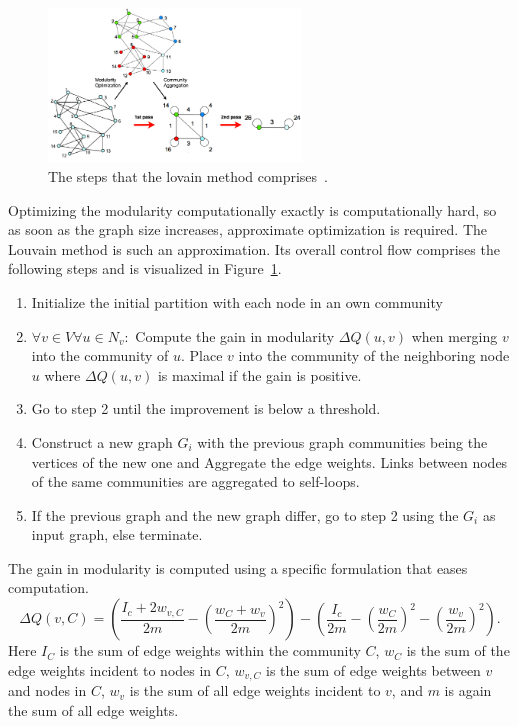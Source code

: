                 \begin{figure}[htp]
                    \begin{center}
                        \includegraphics[keepaspectratio,width=0.6\textwidth]{img/03-graphs/louvain.png}
                    \end{center}
                    \caption{The steps that the lovain method comprises~\autocite{blondel2008fast}.} 
                    \label{louvain-fig}
                \end{figure}
                
                Optimizing the modularity computationally exactly is computationally hard, so as soon as the graph size increases, approximate optimization is required.
                The Louvain method is such an approximation.
                Its overall control flow comprises the following steps and is visualized in Figure~\ref{louvain-fig}.
                \begin{enumerate}
                \item Initialize the initial partition with each node in an own community
                \item $\forall v \in V \forall u \in N_v:$ 
                Compute the gain in modularity $\Delta Q(u,v)$ when merging $v$ into the community of $u$. 
                Place $v$ into the community of the neighboring node $u$ where $\Delta Q(u,v)$ is maximal if the gain is positive.
                \item Go to step 2 until the improvement is below a threshold.
                \item Construct a new graph $G_i$ with the previous graph communities being the vertices of the new one and Aggregate the edge weights. 
                Links between nodes of the same communities are aggregated to self-loops.
                \item If the previous graph and the new graph differ, go to step 2 using the $G_i$ as input graph, else terminate.
                \end{enumerate}
                The gain in modularity is computed using a specific formulation that eases computation.
                \[ 
                  \Delta Q(v, C) = \left( \frac{I_c + 2w_{v, C}}{2m} - \left( \frac{w_C + w_v}{2m} \right)^2 \right) - \left( \frac{I_c}{2m} - \left( \frac{w_C}{2m} \right)^2 - \left( \frac{w_v}{2m} \right)^2 \right).
                \]
                Here $I_C$ is the sum of edge weights within the community $C$, $w_C$ is the sum of the edge weights incident to nodes in $C$, $w_{v, C}$ is the sum of edge weights between $v$ and nodes in $C$, $w_v$ is the sum of all edge weights incident to $v$, and $m$ is again the sum of all edge weights.
                
